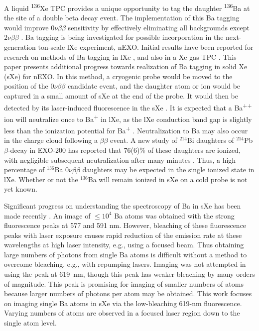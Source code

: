 \documentclass[aps,pra,reprint,superscriptaddress]{revtex4-1}
\begin{document}
A liquid \textsuperscript{136}Xe TPC provides a unique opportunity to tag the daughter \textsuperscript{136}Ba at the site of a double beta decay event. The implementation of this Ba tagging would improve $0\nu\beta\beta$ sensitivity by effectively eliminating all backgrounds except $2\nu\beta\beta$ \cite{Moe1991}.  Ba tagging is being investigated for possible incorporation in the next-generation ton-scale lXe experiment, nEXO.  Initial results have been reported for research on methods of Ba tagging in lXe \cite{Mong2015,Twelker2014}, and also in a Xe gas TPC \cite{Brunner2015}.  This paper presents additional progress towards realization of Ba tagging in solid Xe (sXe) for nEXO.  In this method, a cryogenic probe would be moved to the position of the $0\nu\beta\beta$ candidate event, and the daughter atom or ion would be captured in a small amount of sXe at the end of the probe.  It would then be detected by its laser-induced fluorescence in the sXe \cite{Mong2015}.  It is expected that a Ba\textsuperscript{++} ion will neutralize once to Ba\textsuperscript{+} in lXe, as the lXe conduction band gap is slightly less than the ionization potential for Ba\textsuperscript{+} \cite{Moe1991}.  Neutralization to Ba may also occur in the charge cloud following a $\beta\beta$ event.  A new study of $^{214}$Bi daughters of $^{214}$Pb $\beta$-decay in EXO-200 has reported that 76(6)\% of these daughters are ionized, with negligible subsequent neutralization after many minutes \cite{alphaion}.  Thus, a high percentage of $^{136}$Ba $0\nu\beta\beta$ daughters may be expected in the single ionized state in lXe.  Whether or not the $^{136}$Ba will remain ionized in sXe on a cold probe is not yet known.

Significant progress on understanding the spectroscopy of Ba in sXe has been made recently \cite{Mong2015,McCaffrey2016}.  An image of $\leq 10^4$ Ba atoms was obtained with the strong fluorescence peaks at 577 and 591 nm.  However, bleaching of these fluorescence peaks with laser exposure causes rapid reduction of the emission rate at these wavelengths at high laser intensity, e.g., using a focused beam.  Thus obtaining large numbers of photons from single Ba atoms is difficult without a method to overcome bleaching, e.g., with repumping lasers.  Imaging was not attempted in \cite{Mong2015} using the peak at 619~nm, though this peak has weaker bleaching by many orders of magnitude.  This peak is promising for imaging of smaller numbers of atoms because larger numbers of photons per atom may be obtained.  This work focuses on imaging single Ba atoms in sXe via the low-bleaching 619-nm fluorescence.  Varying numbers of atoms are observed in a focused laser region down to the single atom level.
\end{document}
